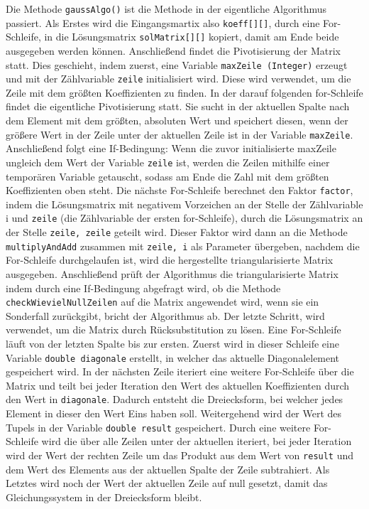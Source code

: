 \documentclass[a4paper, 12pt]{report}
\begin{document}
Die Methode \texttt{gaussAlgo()} ist die Methode in der eigentliche Algorithmus passiert.
Als Erstes wird die Eingangsmartix also \texttt{koeff[][]}, durch eine For-Schleife, in die Lösungsmatrix \texttt{solMatrix[][]} kopiert, damit am Ende
beide ausgegeben werden können.
Anschließend findet die Pivotisierung der Matrix statt. Dies geschieht, indem zuerst,
eine Variable \texttt{maxZeile (Integer)} erzeugt und mit der Zählvariable \texttt{zeile} initialisiert wird.
Diese wird verwendet, um die Zeile mit dem größten Koeffizienten zu finden.
In der darauf folgenden for-Schleife findet die eigentliche Pivotisierung statt.
Sie sucht in der aktuellen Spalte nach dem Element mit dem größten, absoluten Wert
und speichert diesen, wenn der größere Wert in der Zeile unter der aktuellen Zeile ist in der Variable \texttt{maxZeile}.
Anschließend folgt eine If-Bedingung: Wenn die zuvor initialisierte maxZeile ungleich dem Wert der Variable \texttt{zeile} ist,
werden die Zeilen mithilfe einer temporären Variable getauscht, sodass am Ende die
Zahl mit dem größten Koeffizienten oben steht.
Die nächste For-Schleife berechnet den Faktor \texttt{factor}, indem die Lösungsmatrix mit negativem Vorzeichen an der Stelle der Zählvariable i
und \texttt{zeile} (die Zählvariable der ersten for-Schleife), durch die Lösungsmatrix an der Stelle \texttt{zeile, zeile} geteilt wird.
Dieser Faktor wird dann an die Methode \texttt{multiplyAndAdd} zusammen mit \texttt{zeile, i} als Parameter übergeben, nachdem
die For-Schleife durchgelaufen ist, wird die hergestellte triangularisierte Matrix  ausgegeben. Anschließend prüft der Algorithmus
die triangularisierte Matrix indem durch eine If-Bedingung abgefragt wird, ob die Methode \texttt{checkWievielNullZeilen} auf
die Matrix angewendet wird, wenn sie ein Sonderfall zurückgibt, bricht der Algorithmus ab.
Der letzte Schritt, wird verwendet, um die Matrix durch Rücksubstitution zu lösen.
Eine For-Schleife läuft von der letzten Spalte bis zur ersten. Zuerst wird in dieser Schleife eine Variable \texttt{double diagonale}
erstellt, in welcher das aktuelle Diagonalelement gespeichert wird. In der nächsten Zeile iteriert eine weitere For-Schleife
über die Matrix und teilt bei jeder Iteration den Wert des aktuellen Koeffizienten durch den Wert in \texttt{diagonale}.
Dadurch entsteht die Dreiecksform, bei welcher jedes Element in dieser den Wert Eins haben soll.
Weitergehend wird der Wert des Tupels in der Variable \texttt{double result} gespeichert.
Durch eine weitere For-Schleife wird die über alle Zeilen unter der aktuellen iteriert, bei jeder Iteration wird der Wert
der rechten Zeile um das Produkt aus dem Wert von \texttt{result} und dem Wert des Elements aus der aktuellen Spalte der Zeile
subtrahiert. Als Letztes wird noch der Wert der aktuellen Zeile auf null gesetzt, damit das Gleichungssystem in der Dreiecksform
bleibt.
\end{document}

